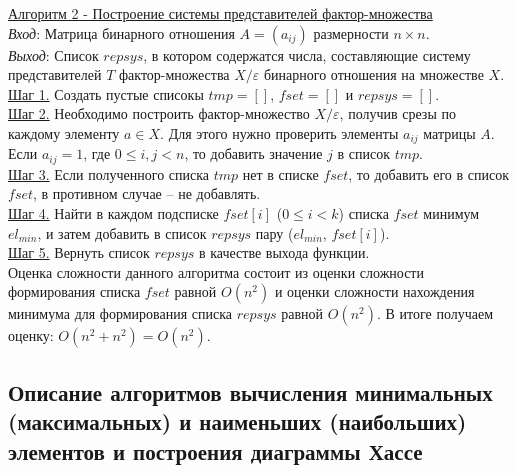 \documentclass[bachelor, och, labwork]{shiza}
\begin{document}
        \underline{Алгоритм 2 - Построение системы представителей фактор-множества}\\
            \textit{Вход}: Матрица бинарного отношения $A = (a_{ij})$ размерности $n \times n$.\\
            \textit{Выход}: Список $repsys$, в котором содержатся числа, составляющие систему представителей 
            $T$ фактор-множества $X/\varepsilon$ бинарного отношения на множестве $X$.\\
            \underline{Шаг 1.} Создать пустые списокы $tmp = []$, $fset = []$ и $repsys = []$.\\ 
            \underline{Шаг 2.} Необходимо построить фактор-множество $X/\varepsilon$, получив срезы по каждому элементу $a \in X$.
            Для этого нужно проверить элементы $a_{ij}$ матрицы $A$. Если $a_{ij} = 1$, где $0 \leq i, j < n$, то добавить значение $j$
            в список $tmp$. \\ 
            \underline{Шаг 3.} Если полученного списка $tmp$ нет в списке $fset$, то добавить его в список $fset$, в противном
            случае -- не добавлять.\\
            \underline{Шаг 4.} Найти в каждом подсписке $fset[i]$ ($0 \leq i < k$) списка $fset$ минимум $el_{min}$, и затем добавить
            в список $repsys$ пару ($el_{min}$, $fset[i]$). \\
            \underline{Шаг 5.} Вернуть список $repsys$ в качестве выхода функции. \\
            
            Оценка сложности данного алгоритма состоит из оценки сложности формирования списка $fset$ равной $O(n^2)$ и оценки сложности
            нахождения минимума для формирования списка $repsys$ равной $O(n^2)$. В итоге получаем оценку: $O(n^2 + n^2) = O(n^2)$.\\

    \subsection{Описание  алгоритмов  вычисления  минимальных  (максимальных)  и  наименьших (наибольших) элементов и
    построения диаграммы Хассе}
\end{document}
